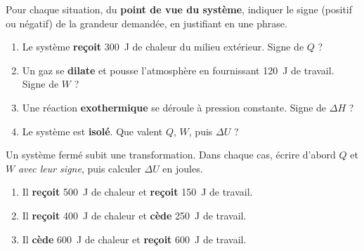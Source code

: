 \documentclass[11pt,a4paper]{article}
\newcommand{\dH}{\Delta H}
\newcommand{\dU}{\Delta U}
\begin{document}
\begin{center}
\end{center}

\begin{exercice}
Pour chaque situation, du \textbf{point de vue du système}, indiquer le signe (positif ou négatif) de la
grandeur demandée, en justifiant en une phrase.
\begin{enumerate}[label=\alph*),leftmargin=2em,topsep=2pt,itemsep=2pt]
  \item Le système \textbf{reçoit} \SI{300}{\joule} de chaleur du milieu extérieur. Signe de $Q$ ?
  \item Un gaz se \textbf{dilate} et pousse l'atmosphère en fournissant \SI{120}{\joule} de travail. Signe de $W$ ?
  \item Une réaction \textbf{exothermique} se déroule à pression constante. Signe de $\dH$ ?
  \item Le système est \textbf{isolé}. Que valent $Q$, $W$, puis $\dU$ ?
\end{enumerate}
\end{exercice}

\begin{exercice}[appliquer $\dU = Q + W$]
Un système fermé subit une transformation. Dans chaque cas, écrire d'abord $Q$ et $W$ \emph{avec leur signe},
puis calculer $\dU$ en joules.
\begin{enumerate}[label=\alph*),leftmargin=2em,topsep=2pt,itemsep=2pt]
  \item Il \textbf{reçoit} \SI{500}{\joule} de chaleur et \textbf{reçoit} \SI{150}{\joule} de travail.
  \item Il \textbf{reçoit} \SI{400}{\joule} de chaleur et \textbf{cède} \SI{250}{\joule} de travail.
  \item Il \textbf{cède} \SI{600}{\joule} de chaleur et \textbf{reçoit} \SI{600}{\joule} de travail.
\end{enumerate}
\end{exercice}
\end{document}
